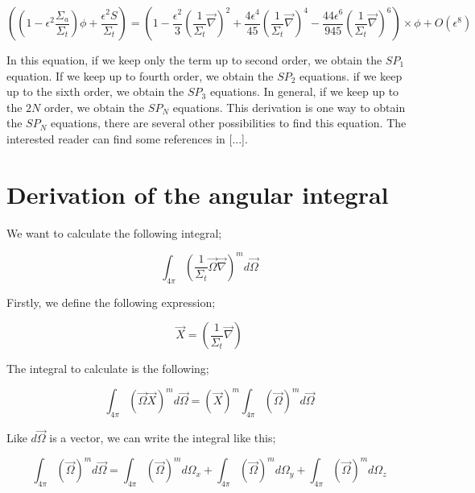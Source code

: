 \documentclass[a4paper, 12pt]{report}
\begin{document}
\begin{appendix}
\begin{equation}
\left(\left(1-\epsilon^2\frac{\Sigma_a}{\Sigma_t}\right)\phi + \frac{\epsilon^2S}{ \Sigma_t}\right)= \left( 1  - \frac{\epsilon^2}{3} \left(\frac{1}{\Sigma_t} \vec{\nabla}\right)^2 + \frac{4\epsilon^4}{45} \left(\frac{1}{\Sigma_t} \vec{\nabla}\right)^4 - \frac{44\epsilon^6}{945} \left(\frac{1}{\Sigma_t} \vec{\nabla}\right)^6 \right) \times \phi + O(\epsilon^8)
\end{equation}

In this equation, if we keep only the term up to second order, we obtain the $SP_1$ equation.
If we keep up to fourth order, we obtain the $SP_2$ equations. if we keep up to the sixth order, we obtain the $SP_3$ equations. In general, if we keep up to the $2N$ order, we obtain the $SP_N$ equations. This derivation is one way to obtain the $SP_N$ equations, there are several other possibilities to find this equation. The interested reader can find some references in [...].

\chapter{Derivation of the angular integral}\label{Annex}


We want to calculate the following integral;

\begin{equation}
\int_{4\pi} \left(\frac{1}{\Sigma_t}\vec{\Omega}\vec{\nabla}\right)^m d\vec{\Omega}
\end{equation}

Firstly, we define the following expression;

\begin{equation}
\vec{X} =  \left(\frac{1}{\Sigma_t}\vec{\nabla}\right)
\end{equation}

The integral to calculate is the following;

\begin{equation}
\int_{4\pi} \left(\vec{\Omega}\vec{X}\right)^m d\vec{\Omega} = \left(\vec{X}\right)^m\int_{4\pi} \left(\vec{\Omega}\right)^m d\vec{\Omega}
\end{equation}

Like $d\vec{\Omega}$ is a vector, we can write the integral like this;

\begin{equation}
\int_{4\pi} \left(\vec{\Omega}\right)^m d\vec{\Omega} = \int_{4\pi} \left(\vec{\Omega}\right)^{m}  d\Omega_x + \int_{4\pi} \left(\vec{\Omega}\right)^{m} d\Omega_y + \int_{4\pi} \left(\vec{\Omega}\right)^{m}  d\Omega_z
\end{equation}


\end{appendix}
\end{document}

